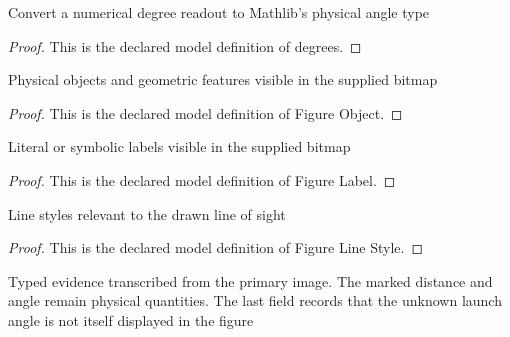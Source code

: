 \begin{definition}[degrees]
  \label{def:physics:phyx-mini-0742:phyxminiproblems-problemphyxmini0742-degrees}
  Convert a numerical degree readout to Mathlib's physical angle type
\end{definition}
\begin{proof}
  This is the declared model definition of degrees.
\end{proof}
\begin{definition}
  \label{def:physics:phyx-mini-0742:phyxminiproblems-problemphyxmini0742-figureobject}
  Physical objects and geometric features visible in the supplied bitmap
\end{definition}
\begin{proof}
  This is the declared model definition of Figure Object.
\end{proof}
\begin{definition}
  \label{def:physics:phyx-mini-0742:phyxminiproblems-problemphyxmini0742-figurelabel}
  Literal or symbolic labels visible in the supplied bitmap
\end{definition}
\begin{proof}
  This is the declared model definition of Figure Label.
\end{proof}
\begin{definition}
  \label{def:physics:phyx-mini-0742:phyxminiproblems-problemphyxmini0742-figurelinestyle}
  Line styles relevant to the drawn line of sight
\end{definition}
\begin{proof}
  This is the declared model definition of Figure Line Style.
\end{proof}
\begin{definition}
  \label{def:physics:phyx-mini-0742:phyxminiproblems-problemphyxmini0742-archerfishfigure}
  Typed evidence transcribed from the primary image. The marked distance and angle remain physical quantities. The last field records that the unknown launch angle is not itself displayed in the figure
\end{definition}
